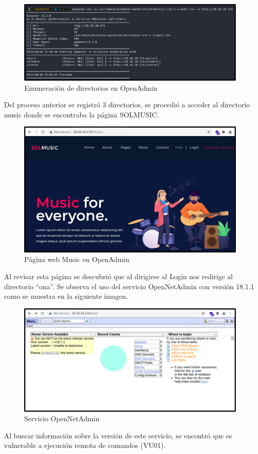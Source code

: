 \begin{figure}[H]
    \centering
    \includegraphics[width=0.99\textwidth]{imagenes/enudicopen.png}
    \caption{Enumeración de directorios en OpenAdmin}
\end{figure}
\par
Del proceso anterior se registró 3 directorios, se procedió a acceder al directorio music donde se encontraba la página SOLMUSIC.

\begin{figure}[H]
    \centering
    \includegraphics[width=0.99\textwidth]{imagenes/musicopen.png}
    \caption{Página web Music en OpenAdmin}
\end{figure}

Al revisar esta página se descubrió que al dirigirse al Login nos redirige al directorio “ona”. Se observa el uso del servicio OpenNetAdmin con versión 18.1.1 como se muestra en la siguiente imagen.

\begin{figure}[H]
    \centering
    \includegraphics[width=0.99\textwidth]{imagenes/onaopen.png}
    \caption{Servicio OpenNetAdmin}
\end{figure}
Al buscar información sobre la versión de este servicio, se encontró que es vulnerable a ejecución remota de comandos (VU01).

